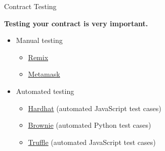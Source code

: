 \documentclass[]{beamer}
\begin{document}

\begin{frame}{Contract Testing}
		
	\textbf{Testing your contract is very important.}\\
	
	\begin{itemize}
		\item<2-> Manual testing
		\begin{itemize}
			\item<2-> \href{https://remix.ethereum.org/}{\link Remix}
			\item<2-> \href{https://metamask.io}{\link Metamask}
		\end{itemize}
		\item<3-> Automated testing
		\begin{itemize}
			\item<3-> \href{https://hardhat.org/}{\link Hardhat} (automated JavaScript test cases)
			\item<3-> \href{https://github.com/eth-brownie/brownie}{\link Brownie} (automated Python test cases)
			\item<3-> \href{https://www.trufflesuite.com/truffle}{\link Truffle} (automated JavaScript test cases)
		\end{itemize}
	\end{itemize}
\end{frame}
\end{document}
